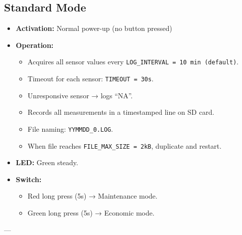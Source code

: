 \documentclass[a4paper,12pt]{article}
\begin{document}
\subsection{Standard Mode}
\begin{itemize}
  \item \textbf{Activation:} Normal power-up (no button pressed)
  \item \textbf{Operation:}
  \begin{itemize}
    \item Acquires all sensor values every \texttt{LOG\_INTERVAL = 10 min (default)}.
    \item Timeout for each sensor: \texttt{TIMEOUT = 30s}.
    \item Unresponsive sensor → logs ``NA''.
    \item Records all measurements in a timestamped line on SD card.
    \item File naming: \texttt{YYMMDD\_0.LOG}.
    \item When file reaches \texttt{FILE\_MAX\_SIZE = 2kB}, duplicate and restart.
  \end{itemize}
  \item \textbf{LED:} Green steady.
  \item \textbf{Switch:} 
  \begin{itemize}
    \item Red long press (5s) → Maintenance mode.
    \item Green long press (5s) → Economic mode.
  \end{itemize}
\end{itemize}

---
\end{document}
